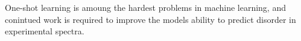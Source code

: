 One-shot learning is amoung the hardest problems in machine learning, and conintued work is required to improve the models ability to predict disorder in experimental spectra.
